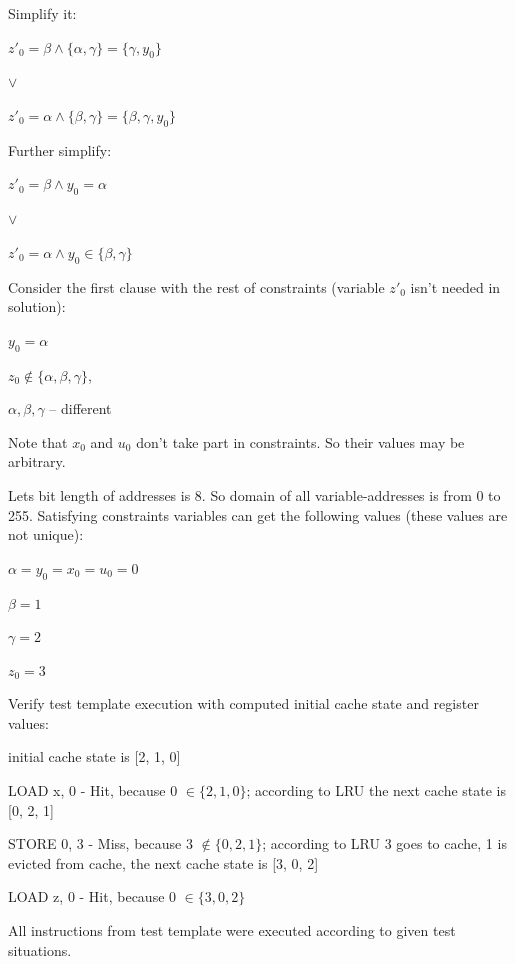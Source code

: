 Simplify it:

$z'_0 = \beta \wedge \{ \alpha, \gamma \} = \{ \gamma, y_0 \}$

$\vee$

$z'_0 = \alpha \wedge \{ \beta, \gamma \} = \{ \beta, \gamma, y_0
\}$

Further simplify:

$z'_0 = \beta \wedge y_0 = \alpha$

$\vee$

$z'_0 = \alpha \wedge y_0 \in \{ \beta, \gamma \}$

Consider the first clause with the rest of constraints (variable
$z'_0$ isn't needed in solution):

$y_0 = \alpha$

$z_0 \notin \{ \alpha, \beta, \gamma \}$,

$\alpha, \beta, \gamma$ -- different

Note that $x_0$ and $u_0$ don't take part in constraints. So their
values may be arbitrary.

Lets bit length of addresses is 8. So domain of all
variable-addresses is from 0 to 255. Satisfying constraints
variables can get the following values (these values are not
unique):

$\alpha = y_0 = x_0 = u_0 = 0$

$\beta = 1$

$\gamma = 2$

$z_0 = 3$

Verify test template execution with computed initial cache state and
register values:

initial cache state is [2, 1, 0]

LOAD x, 0 - Hit, because 0 $\in \{2,1,0\}$; according to LRU the
next cache state is [0, 2, 1]

STORE 0, 3 - Miss, because 3 $\notin \{0,2,1\}$; according to LRU 3
goes to cache, 1 is evicted from cache, the next cache state is [3,
0, 2]

LOAD z, 0 - Hit, because 0 $\in \{3, 0, 2\}$

All instructions from test template were executed according to given
test situations.
